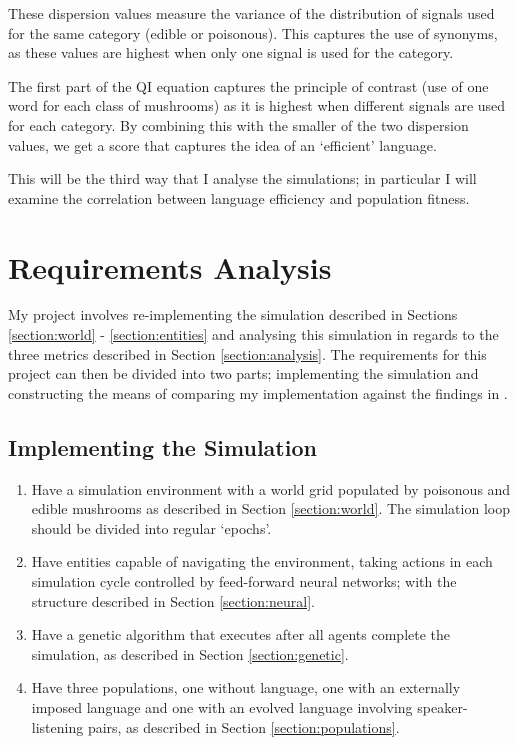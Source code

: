 \documentclass[12pt,a4paper,twoside,openright]{report}
\begin{document}
These dispersion values measure the variance of the distribution of signals used for the same category (edible or poisonous). This captures the use of synonyms, as these values are highest when only one signal is used for the category. 

The first part of the QI equation captures the principle of contrast (use of one word for each class of mushrooms) as it is highest when different signals are used for each category. By combining this with the smaller of the two dispersion values, we get a score that captures the idea of an `efficient' language.

This will be the third way that I analyse the simulations; in particular I will examine the correlation between language efficiency and population fitness.


\section{Requirements Analysis}\label{section:requirements}

My project involves re-implementing the simulation described in Sections \ref{section:world} - \ref{section:entities} and analysing this simulation in regards to the three metrics described in Section \ref{section:analysis}. The requirements for this project can then be divided into two parts; implementing the simulation and constructing the means of comparing my implementation against the findings in \citet{Cangelosi1998}.

\subsection*{Implementing the Simulation}

\begin{enumerate}

\item Have a simulation environment with a world grid populated by poisonous and edible mushrooms as described in Section \ref{section:world}. The simulation loop should be divided into regular `epochs'.

\item Have entities capable of navigating the environment, taking actions in each simulation cycle controlled by feed-forward neural networks; with the structure described in Section \ref{section:neural}.

\item Have a genetic algorithm that executes after all agents complete the simulation, as described in Section \ref{section:genetic}.

\item Have three populations, one without language, one with an externally imposed language and one with an evolved language involving speaker-listening pairs, as described in Section \ref{section:populations}.

\end{enumerate}
\end{document}

